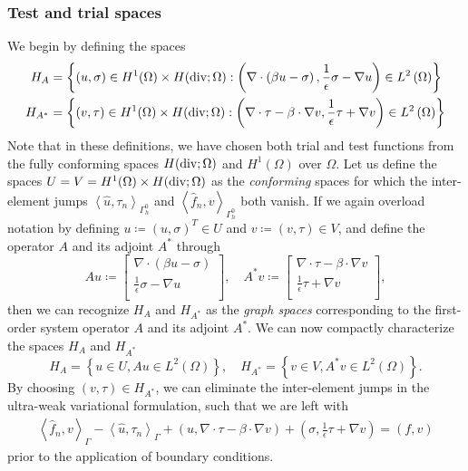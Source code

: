 \documentclass[11pt,onecolumn]{scrartcl}
\newcommand{\LRp}[1]{\left( #1 \right)}
\newcommand{\LRa}[1]{\left\langle #1 \right\rangle}
\newcommand{\LRc}[1]{\left\{ #1 \right\}}
\newcommand{\Grad} {\ensuremath{\nabla}}
\newcommand{\uh}{\widehat{u}}
\newcommand{\fnh}{\widehat{f}_n}
\newcommand{\Gh}{\Gamma_h}
\newcommand{\grad}{\nabla}
\renewcommand{\div}{\grad \cdot}
\def\vecttwo#1#2{\left[
\begin{array}{c}
#1\\
#2\\
\end{array}
\right]}
\begin{document}
\subsubsection{Test and trial spaces}
We begin by defining the spaces
\begin{align*}
H_A &= \LRc{\LRp{u, \sigma} \in H^1(\Omega) \times H({\rm div};\Omega): \LRp{\div\LRp{\beta u - \sigma}, \frac{1}{\epsilon}\sigma - \grad u}  \in L^2\LRp{\Omega}}\\
H_{A^*} &= \LRc{\LRp{v,\tau} \in H^1(\Omega)\times H({\rm div};\Omega): \LRp{\div \tau - \beta\cdot \Grad v, \frac{1}{\epsilon}\tau + \Grad v} \in L^2\LRp{\Omega}}
\end{align*}
Note that in these definitions, we have chosen both trial and test functions from the fully conforming spaces $H({\rm div};\Omega)$ and $H^1(\Omega)$ over $\Omega$.  Let us define the spaces ${U} = {V} = H^1(\Omega) \times H({\rm div};\Omega)$ as the \textit{conforming} spaces for which the inter-element jumps $\LRa{\uh,\tau_n}_{\Gh^0}$ and $\LRa{\fnh,v}_{\Gh^0}$ both vanish.  If we again overload notation by defining ${u} \coloneqq \LRp{u,\sigma}^T\in {U}$ and ${v} \coloneqq \LRp{v,\tau} \in {V}$, and define the operator $A$ and its adjoint $A^*$ through
\[
A{u} \coloneqq \vecttwo{\div\LRp{\beta u - \sigma}}{\frac{1}{\epsilon}\sigma - \grad u}, \quad A^*{v} \coloneqq \vecttwo{\div \tau - \beta\cdot \Grad v}{\frac{1}{\epsilon}\tau + \Grad v},
\]
then we can recognize $H_A$ and $H_{A^*}$ as the \textit{graph spaces} corresponding to the first-order system operator $A$ and its adjoint $A^*$. We can now compactly characterize the spaces $H_A$ and $H_{A^*}$
\[
H_A = \LRc{{u} \in {U}, A{u} \in L^2\LRp{\Omega}}, \quad H_{A^*} = \LRc{{v} \in  {V}, A^*{v} \in L^2\LRp{\Omega}}.
\]
By choosing $\LRp{v,\tau}\in H_{A^*}$, we can eliminate the inter-element jumps in the ultra-weak variational formulation, such that we are left with
\begin{align*}
\LRa{\fnh,v}_{\Gamma} - \LRa{\uh,\tau_n}_{\Gamma} + \LRp{u, \Grad\cdot \tau - \beta\cdot \Grad v} + \LRp{\sigma, \frac{1}{\epsilon}\tau + \Grad v} = \LRp{f,v}
\end{align*}
prior to the application of boundary conditions.  
\end{document}
